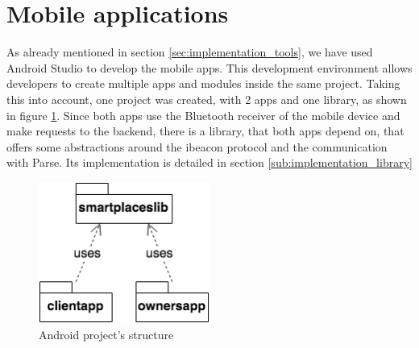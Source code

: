 \section{Mobile applications}
\label{sec:implementation_mobile_applications}
As already mentioned in section \ref{sec:implementation_tools}, we have used Android Studio to develop the mobile apps.
This development environment allows developers to create multiple
apps and modules inside the same project.
Taking this into account,
one project was created, with 2 apps and one library, as shown in figure
\ref{fig:smartplaces_package}. Since both apps use the Bluetooth receiver
of the mobile device and make requests to the backend, there is a library,
that both apps depend on, that offers some abstractions around the ibeacon
protocol and the communication with Parse.
Its implementation is detailed in section \ref{sub:implementation_library}

\begin{figure}[!ht]
  \centering
    \includegraphics[width=0.5\textwidth, height=0.15\textheight,
      keepaspectratio]{images/smartplaces_package}
    \caption[Android project's structure]{Android project's structure}
    \label{fig:smartplaces_package}
\end{figure}

